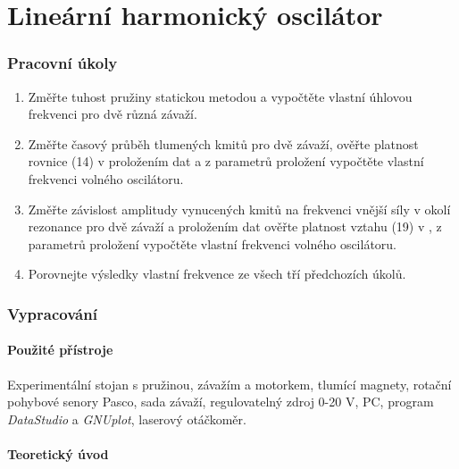 \documentclass[english]{article}
\begin{document}




\setlength{\parindent}{0.5cm}
\part{Lineární harmonický oscilátor}

\section{Pracovní úkoly}
	\begin{enumerate}
	\item Změřte tuhost pružiny statickou metodou a vypočtěte vlastní úhlovou frekvenci pro dvě různá závaží.
	\item Změřte časový průběh tlumených kmitů pro dvě závaží, ověřte platnost rovnice (14) v \cite{bib:zadani_1} proložením dat a z parametrů proložení vypočtěte vlastní frekvenci volného oscilátoru.
	\item Změřte závislost amplitudy vynucených kmitů na frekvenci vnější síly v okolí rezonance pro dvě závaží a proložením dat ověřte platnost vztahu (19) v \cite{bib:zadani_1}, z parametrů proložení vypočtěte vlastní frekvenci volného oscilátoru.
	\item Porovnejte výsledky vlastní frekvence ze všech tří předchozích úkolů.
	\end{enumerate}

\section{Vypracování}

\subsection{Použité přístroje}
	Experimentální stojan s pružinou, závažím a motorkem, tlumící magnety, rotační pohybové senory Pasco, sada závaží, regulovatelný zdroj 0-20 V, PC, program \emph{DataStudio} a \emph{GNUplot}, laserový otáčkoměr.

\subsection{Teoretický úvod}
\end{document}
